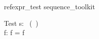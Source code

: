 \begin{zsection}
   \SECTION  refexpr\_test \parents sequence\_toolkit
\end{zsection}

\begin{schema}{Test}
   s: \seq~(\power~\nat) \\
   f: \nat \pfun \nat
\where
   f = f\plus
\end{schema}